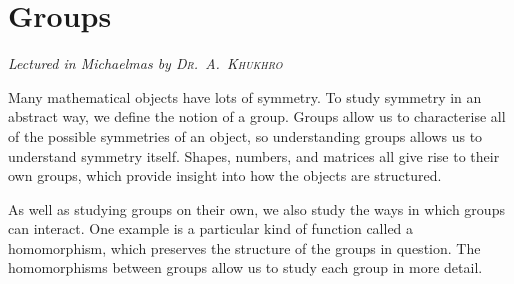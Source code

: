 \chapter[Groups \\ \textnormal{\emph{Lectured in Michaelmas \oldstylenums{2020} by \textsc{Dr.\ A.\ Khukhro}}}]{Groups}
\emph{\Large Lectured in Michaelmas  by \textsc{Dr.\ A.\ Khukhro}}

Many mathematical objects have lots of symmetry.
To study symmetry in an abstract way, we define the notion of a group.
Groups allow us to characterise all of the possible symmetries of an object, so understanding groups allows us to understand symmetry itself.
Shapes, numbers, and matrices all give rise to their own groups, which provide insight into how the objects are structured.

As well as studying groups on their own, we also study the ways in which groups can interact.
One example is a particular kind of function called a homomorphism, which preserves the structure of the groups in question.
The homomorphisms between groups allow us to study each group in more detail.


